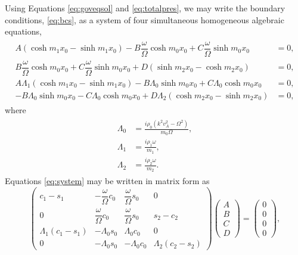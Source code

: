 \documentclass[12pt]{ociamthesis}
\begin{document}
Using Equations \eqref{eq:goveqsol} and \eqref{eq:totalpres}, we may write the boundary conditions, \eqref{eq:bcs}, as a system of four simultaneous homogeneous algebraic equations,
%
\begin{align}
\begin{split}
\label{eq:system}
A (\cosh m_1 x_0 - \sinh m_1 x_0)
- B \dfrac{\omega}{\Omega} \cosh m_0 x_0
+ C \dfrac{\omega}{\Omega} \sinh m_0 x_0 & = 0,
\\[0.3cm]
B \dfrac{\omega}{\Omega} \cosh m_0 x_0
+ C \dfrac{\omega}{\Omega} \sinh m_0 x_0
+ D(\sinh m_2 x_0 - \cosh m_2 x_0) & = 0,
\\[0.3cm]
A \Lambda_1 (\cosh m_1 x_0 - \sinh m_1 x_0)
- B \Lambda_0 \sinh m_0 x_0
+ C \Lambda_0 \cosh m_0 x_0 & = 0,
\\[0.3cm]
- B \Lambda_0 \sinh m_0 x_0
- C \Lambda_0 \cosh m_0 x_0
+ D \Lambda_2 (\cosh m_2 x_0 - \sinh m_2 x_0) & = 0,
\end{split}
\end{align}
%
where
%
\begin{align}
\begin{split}
\label{eq:lambdas}
\Lambda_0 
& = \frac{i \rho_0 \left( k^2 v_A^2 - \Omega^2 \right)}{m_0 \Omega},
\\[0.3cm]
\Lambda_1 
& = \frac{i \rho_1 \omega}{m_1},
\\[0.3cm]
\Lambda_2 
& = \frac{i \rho_2 \omega}{m_2}.
\end{split}
\end{align}
%
Equations \eqref{eq:system} may be written in matrix form as
%
\begin{equation}
\label{eq:matrix1}
\begin{pmatrix}
c_1 - s_1 
& - \dfrac{\omega}{\Omega} c_0
& \dfrac{\omega}{\Omega} s_0
& 0
\\[0.3cm]
0
& \dfrac{\omega}{\Omega} c_0
& \dfrac{\omega}{\Omega} s_0
& s_2 - c_2
\\[0.3cm]
\Lambda_1 (c_1 - s_1)
& - \Lambda_0 s_0
& \Lambda_0 c_0
& 0
\\[0.3cm]
0
& - \Lambda_0 s_0
& - \Lambda_0 c_0
& \Lambda_2 (c_2 - s_2)
\end{pmatrix}
\begin{pmatrix}
A
\\[0.3cm]
B
\\[0.3cm]
C
\\[0.3cm]
D
\end{pmatrix}
=
\begin{pmatrix}
0
\\[0.3cm]
0
\\[0.3cm]
0
\\[0.3cm]
0
\end{pmatrix},
\end{equation}
\end{document}

